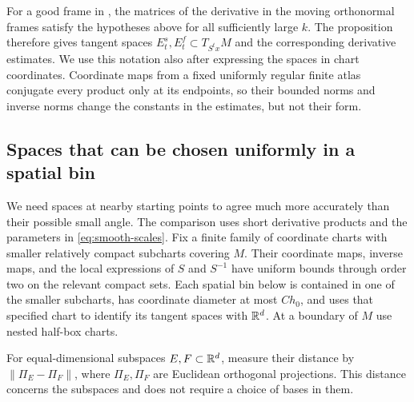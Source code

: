For a good frame in , the matrices of the
derivative in the moving orthonormal frames satisfy the hypotheses
above for all sufficiently large $k$.
The proposition therefore gives tangent spaces
$E_t^s,E_t^f\subset T_{S^t x}M$ and the corresponding derivative
estimates.  We use this notation also after expressing the spaces in
chart coordinates.  Coordinate maps from a fixed uniformly regular
finite atlas conjugate every product only at its endpoints, so their
bounded norms and inverse norms change the constants in the estimates,
but not their form.

\subsection{Spaces that can be chosen uniformly in a spatial bin}

We need spaces at nearby starting points to agree much more accurately
than their possible small angle.  The comparison uses short derivative
products and the parameters in \eqref{eq:smooth-scales}.
Fix a finite family of coordinate charts with smaller relatively
compact subcharts covering $M$.
Their coordinate maps, inverse maps, and the local expressions of
$S$ and $S^{-1}$ have uniform bounds through order two on the relevant
compact sets.  Each spatial bin below is contained in one of the
smaller subcharts, has coordinate diameter at most $C h_0$, and
uses that specified chart to identify its tangent spaces with $\mathbb R^d$.
At a boundary of $M$ use nested half-box charts.

For equal-dimensional subspaces $E,F\subset\mathbb R^d$, measure their
distance by $\|\Pi_E-\Pi_F\|$, where $\Pi_E,\Pi_F$ are Euclidean
orthogonal projections.  This distance concerns the subspaces and
does not require a choice of bases in them.

